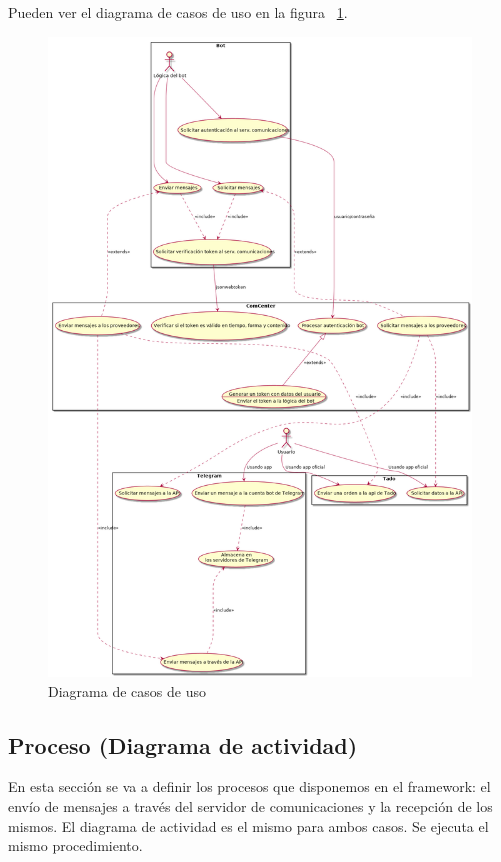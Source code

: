\documentclass[spanish,12pt, a4paper, twoside]{paper}
\begin{document}
Pueden ver el diagrama de casos de uso en la figura ~\ref{fig:Diagrama de casos de uso}.

\begin{figure}
\centering
	\includegraphics[width=\textwidth]{recursos/usecases}
\caption{Diagrama de casos de uso}
\label{fig:Diagrama de casos de uso}
\end{figure}

\subsection{Proceso (Diagrama de actividad)}

En esta sección se va a definir los procesos que disponemos en el framework: el envío de mensajes a través del servidor de comunicaciones y la recepción de los mismos. El diagrama de actividad es el mismo para ambos casos. Se ejecuta el mismo procedimiento.
\end{document}
